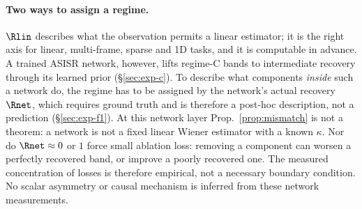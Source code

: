 \paragraph{Two ways to assign a regime.}
$\Rlin$ describes what the observation permits a linear estimator; it is the
right axis for linear, multi-frame, sparse and 1D tasks, and it is computable
in advance. A trained ASISR network, however, lifts regime-C bands to
intermediate recovery through its learned prior (\S\ref{sec:exp-c}). To
describe what components \emph{inside} such a network do, the regime has to
be assigned by the network's actual recovery $\Rnet$, which requires ground
truth and is therefore a post-hoc description, not a prediction
(\S\ref{sec:exp-f1}).
At this network layer Prop.~\ref{prop:mismatch} is not a theorem: a
network is not a fixed linear Wiener estimator with a known $\kappa$.
Nor do $\Rnet\approx0$ or $1$ force small ablation loss: removing a component
can worsen a perfectly recovered band, or improve a poorly recovered one.
The measured concentration of losses is therefore empirical, not a
necessary boundary condition. No scalar asymmetry or causal mechanism is
inferred from these network measurements.
